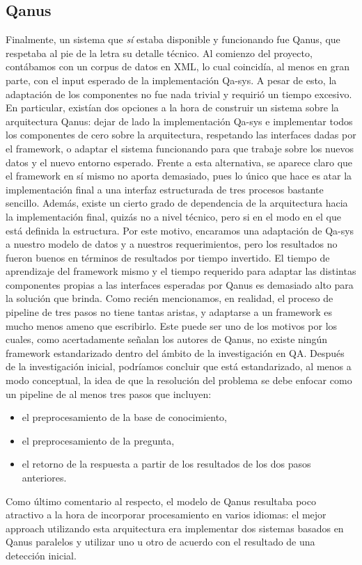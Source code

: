 \bigskip

\subsection{Qanus}

Finalmente, un sistema que \textit{sí} estaba disponible y funcionando
fue Qanus, que respetaba al pie de la letra su detalle técnico. Al comienzo
del proyecto, contábamos con un corpus de datos en XML,
lo cual coincidía, al menos en gran parte, con el input esperado de
la implementación Qa-sys. A pesar de esto, la adaptación de los
componentes no fue nada trivial y requirió un tiempo excesivo. En
particular, existían dos opciones a la hora de construir un sistema
sobre la arquitectura Qanus: dejar de lado la implementación Qa-sys e
implementar todos los componentes de cero sobre la arquitectura, respetando las interfaces
dadas por el framework, o adaptar el sistema funcionando para que
trabaje sobre los nuevos datos y el nuevo entorno esperado. Frente a
esta alternativa, se aparece claro que el framework en sí mismo no
aporta demasiado, pues lo único que hace es atar la implementación
final a una interfaz estructurada de tres procesos bastante sencillo.
Además, existe un cierto grado de dependencia de la arquitectura
hacia la implementación final, quizás no a nivel técnico, pero si
en el modo en el que está definida la estructura. Por este motivo,
encaramos una adaptación de Qa-sys a nuestro modelo de datos y a
nuestros requerimientos, pero los resultados no fueron buenos en
términos de resultados por tiempo invertido. El tiempo de aprendizaje
del framework mismo y el tiempo requerido para adaptar las distintas
componentes propias a las interfaces esperadas por Qanus es demasiado
alto para la solución que brinda. Como recién mencionamos, en
realidad, el proceso de pipeline de tres pasos no tiene tantas aristas,
y adaptarse a un framework es mucho menos ameno que escribirlo. Este
puede ser uno de los motivos por los cuales, como acertadamente
se\~nalan los autores de Qanus, no existe ningún framework
estandarizado dentro del ámbito de la investigación en QA.
Después de la investigación inicial, podríamos concluir que
está estandarizado, al menos a modo conceptual, la idea de que la
resolución del problema se debe enfocar como un pipeline de al menos
tres pasos que incluyen:
\begin{itemize}
\item el preprocesamiento de la base de conocimiento,
\item el preprocesamiento de la pregunta,
\item el retorno de la respuesta a partir de los resultados de los dos pasos anteriores. 
\end{itemize}
Como último comentario al respecto, el modelo de Qanus resultaba poco atractivo
 a la hora de incorporar procesamiento en varios idiomas: el mejor approach
utilizando esta arquitectura era implementar dos sistemas basados en
Qanus paralelos y utilizar uno u otro de acuerdo con el resultado de
una detección inicial. 

